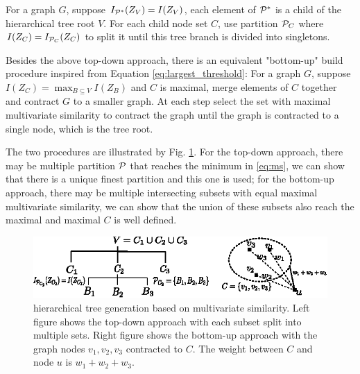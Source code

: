 For a graph $G$, suppose $I_{\P^*}(Z_V)=I(Z_V)$, each element of $\P^*$ is a child of the hierarchical tree root $V$. For each child node set $C$, use partition $\P_C$ where $I(Z_C)=I_{\P_C}(Z_C)$ to split it until this tree branch is divided into singletons.

Besides the above top-down approach, there is an equivalent "bottom-up" build procedure inspired from Equation \eqref{eq:largest_threshold}: For a graph $G$, suppose $I(Z_C) = \max_{B\subseteq V} I(Z_B)$ and $C$ is maximal, merge elements of $C$ together and contract $G$ to a smaller graph. At each step select the set with maximal multivariate similarity to contract the graph until the graph is contracted to a single node, which is the tree root.

The two procedures are illustrated by Fig. \ref{fig:ta}. For the top-down approach, there may be multiple partition $\P$ that reaches the minimum in \eqref{eq:ms}, we can show that there is a unique finest partition and this one is used; for the bottom-up approach, there may be multiple intersecting subsets with equal maximal multivariate similarity, we can show that the union of these subsets also reach the maximal and maximal $C$ is well defined.
\begin{figure}
\centering
\includegraphics[width=\textwidth]{two_approach.eps}
\caption{hierarchical tree generation based on multivariate similarity. Left figure shows the top-down approach with each subset split into multiple sets. Right figure shows the bottom-up approach with the graph nodes $v_1,v_2,v_3$ contracted to $C$. The weight between $C$ and node $u$ is $w_1+w_2+w_3$.}\label{fig:ta}
\end{figure}

